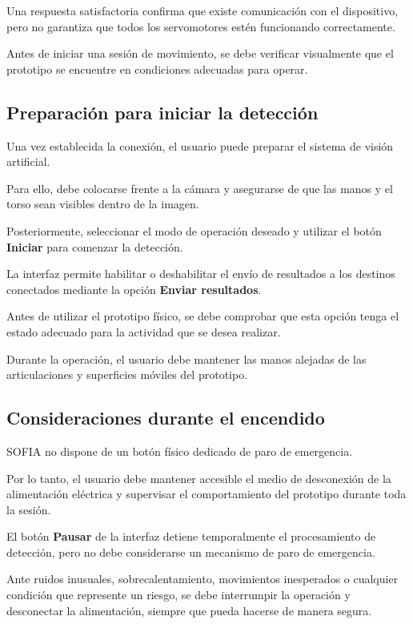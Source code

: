 \documentclass[letterpaper,journal]{IEEEtran}
\begin{document}
Una respuesta satisfactoria confirma que
existe comunicación con el dispositivo,
pero no garantiza que todos los servomotores
estén funcionando correctamente.

Antes de iniciar una sesión de movimiento,
se debe verificar visualmente que el
prototipo se encuentre en condiciones
adecuadas para operar.

\subsection{Preparación para iniciar la detección}

Una vez establecida la conexión, el usuario
puede preparar el sistema de visión artificial.

Para ello, debe colocarse frente a la cámara
y asegurarse de que las manos y el torso
sean visibles dentro de la imagen.

Posteriormente, seleccionar el modo de
operación deseado y utilizar el botón
\textbf{Iniciar} para comenzar la detección.

La interfaz permite habilitar o deshabilitar
el envío de resultados a los destinos
conectados mediante la opción
\textbf{Enviar resultados}.

Antes de utilizar el prototipo físico,
se debe comprobar que esta opción tenga
el estado adecuado para la actividad
que se desea realizar.

Durante la operación, el usuario debe
mantener las manos alejadas de las
articulaciones y superficies móviles
del prototipo.

\subsection{Consideraciones durante el encendido}

SOFIA no dispone de un botón físico
dedicado de paro de emergencia.

Por lo tanto, el usuario debe mantener
accesible el medio de desconexión
de la alimentación eléctrica y supervisar
el comportamiento del prototipo durante
toda la sesión.

El botón \textbf{Pausar} de la interfaz
detiene temporalmente el procesamiento
de detección, pero no debe considerarse
un mecanismo de paro de emergencia.

Ante ruidos inusuales, sobrecalentamiento,
movimientos inesperados o cualquier
condición que represente un riesgo,
se debe interrumpir la operación y
desconectar la alimentación, siempre
que pueda hacerse de manera segura.
\end{document}
